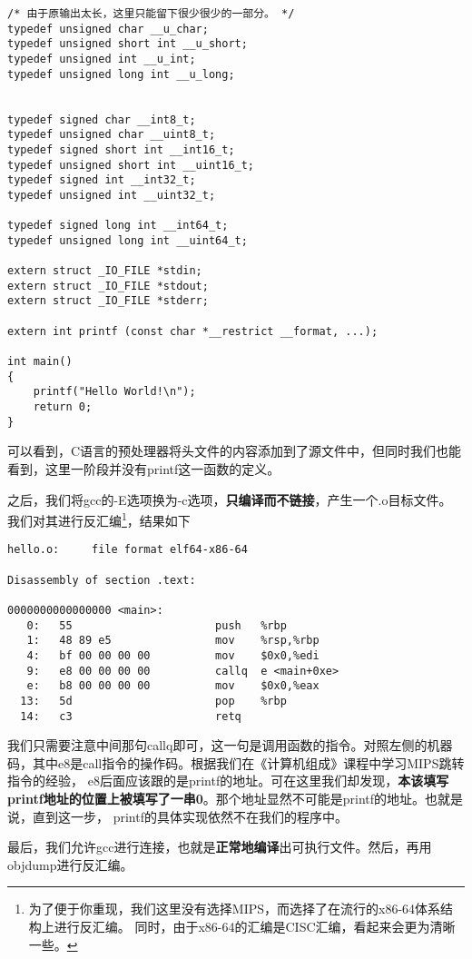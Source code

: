 \begin{verbatim}
/* 由于原输出太长，这里只能留下很少很少的一部分。 */
typedef unsigned char __u_char;
typedef unsigned short int __u_short;
typedef unsigned int __u_int;
typedef unsigned long int __u_long;


typedef signed char __int8_t;
typedef unsigned char __uint8_t;
typedef signed short int __int16_t;
typedef unsigned short int __uint16_t;
typedef signed int __int32_t;
typedef unsigned int __uint32_t;

typedef signed long int __int64_t;
typedef unsigned long int __uint64_t;

extern struct _IO_FILE *stdin;
extern struct _IO_FILE *stdout;
extern struct _IO_FILE *stderr;

extern int printf (const char *__restrict __format, ...);

int main()
{
    printf("Hello World!\n");
    return 0;
}
\end{verbatim}

可以看到，C语言的预处理器将头文件的内容添加到了源文件中，但同时我们也能看到，这里一阶段并没有printf这一函数的定义。

之后，我们将gcc的-E选项换为-c选项，\textbf{只编译而不链接}，产生一个.o目标文件。
我们对其进行反汇编\footnote{为了便于你重现，我们这里没有选择MIPS，而选择了在流行的x86-64体系结构上进行反汇编。
同时，由于x86-64的汇编是CISC汇编，看起来会更为清晰一些。}，结果如下

\begin{verbatim}
hello.o:     file format elf64-x86-64

Disassembly of section .text:

0000000000000000 <main>:
   0:   55                      push   %rbp
   1:   48 89 e5                mov    %rsp,%rbp
   4:   bf 00 00 00 00          mov    $0x0,%edi
   9:   e8 00 00 00 00          callq  e <main+0xe>
   e:   b8 00 00 00 00          mov    $0x0,%eax
  13:   5d                      pop    %rbp
  14:   c3                      retq
\end{verbatim}

我们只需要注意中间那句callq即可，这一句是调用函数的指令。对照左侧的机器码，其中e8是call指令的操作码。根据我们在《计算机组成》课程中学习MIPS跳转指令的经验，
e8后面应该跟的是printf的地址。可在这里我们却发现，\textbf{本该填写printf地址的位置上被填写了一串0}。那个地址显然不可能是printf的地址。也就是说，直到这一步，
printf的具体实现依然不在我们的程序中。

最后，我们允许gcc进行连接，也就是\textbf{正常地编译}出可执行文件。然后，再用objdump进行反汇编。

